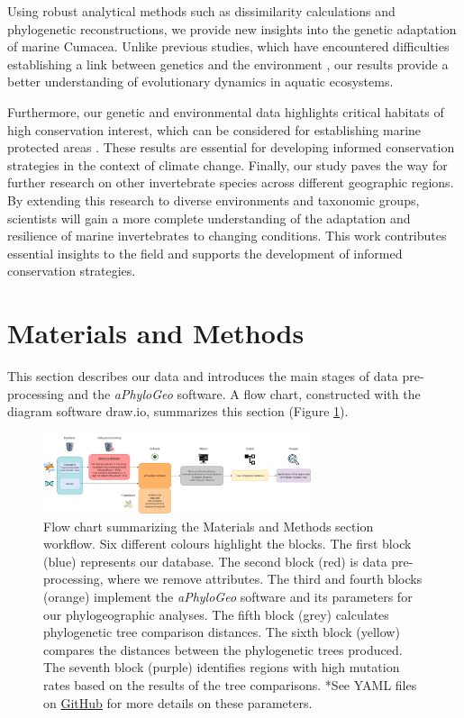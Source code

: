 Using robust analytical methods such as dissimilarity calculations and phylogenetic reconstructions, we provide new insights into the genetic adaptation of marine Cumacea. Unlike previous studies, which have encountered difficulties establishing a link between genetics and the environment \citep{manel2003landscape, balkenhol2009statistical}, our results provide a better understanding of evolutionary dynamics in aquatic ecosystems.

Furthermore, our genetic and environmental data highlights critical habitats of high conservation interest, which can be considered for establishing marine protected areas \citep{levin2009ecological}. These results are essential for developing informed conservation strategies in the context of climate change. Finally, our study paves the way for further research on other invertebrate species across different geographic regions. By extending this research to diverse environments and taxonomic groups, scientists will gain a more complete understanding of the adaptation and resilience of marine invertebrates to changing conditions. This work contributes essential insights to the field and supports the development of informed conservation strategies.

\section{Materials and Methods}\label{materials-methods}
This section describes our data and introduces the main stages of data pre-processing and the \textit{aPhyloGeo} software. A flow chart, constructed with the diagram software draw.io, summarizes this section (Figure \ref{fig:fig1}).

\begin{figure}[htbp]
    \centering
    \includegraphics[width=0.7\textwidth]{diagram.drawio.png}
    \caption{Flow chart summarizing the Materials and Methods section workflow. Six different colours highlight the blocks. The first block (blue) represents our database. The second block (red) is data pre-processing, where we remove attributes. The third and fourth blocks (orange) implement the \textit{aPhyloGeo} software and its parameters for our phylogeographic analyses. The fifth block (grey) calculates phylogenetic tree comparison distances. The sixth block (yellow) compares the distances between the phylogenetic trees produced. The seventh block (purple) identifies regions with high mutation rates based on the results of the tree comparisons. *See YAML files on \href{https://github.com/tahiri-lab/aPhyloGeo}{GitHub} for more details on these parameters. \label{fig:fig1}}
\end{figure}

